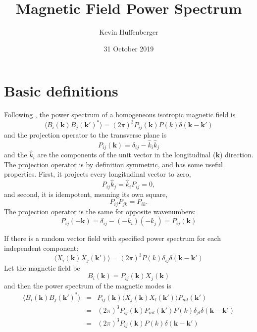 \documentclass{article}
\begin{document}
\title{Magnetic Field Power Spectrum}
\author{Kevin Huffenberger}
\date{31 October 2019}
\maketitle
 
\section{Basic definitions}

Following \citet{2002PhRvD..65l3004M}, the power spectrum of a homogeneous isotropic magnetic field is
\begin{equation}
  \langle B_i(\mathbf{k})  B_j(\mathbf{k}')^* \rangle = (2\pi)^3 P_{ij}(\mathbf{k}) P(k) \delta(\mathbf{k - k}')
  \label{eqn:psdef}
 \end{equation}
 and the projection operator to the transverse plane is
 \begin{equation}
    P_{ij}(\mathbf{k})  = \delta_{ij} - \hat k_i \hat k_j
 \end{equation}
 and the $\hat k_i$ are the components of the unit vector in the longitudinal ($\mathbf{k}$) direction.  The projection operator is by definition symmetric, and has some useful properties.  First, it projects every longitudinal vector to zero,
 \begin{equation}
   P_{ij} \hat k_j =  \hat k_i P_{ij} = 0,
   \label{eqn:transproj}
 \end{equation}
 and second, it is idempotent, meaning its own square,
 \begin{equation}
   P_{ij}P_{jk} = P_{ik}.
   \label{eqn:idemproj}
 \end{equation}
  The projection operator is the same for opposite wavenumbers:
 \begin{equation}
   P_{ij}(-\mathbf{k}) = \delta_{ij} - (-k_i)(-k_j) = P_{ij}(\mathbf{k})
 \end{equation}

 
 If there is a random vector field with specified power spectrum for each independent component:
 \begin{equation}
   \langle X_i(\mathbf{k}) X_j(\mathbf{k}') \rangle = (2\pi)^3 P(k) \delta_{ij}\delta(\mathbf{k - k'})
 \end{equation}
 Let the magnetic field be 
 \begin{equation}
   B_i(\mathbf{k}) = P_{ij}(\mathbf{k}) X_j(\mathbf{k})
 \end{equation}
 and then the power spectrum of the magnetic modes is
 \begin{eqnarray}
   \langle B_i(\mathbf{k})  B_j(\mathbf{k}')^* \rangle &=&  P_{ij}(\mathbf{k}) \langle X_j(\mathbf{k}) X_l(\mathbf{k'}) \rangle P_{ml}(\mathbf{k'}) \\ \nonumber
   &=& (2\pi)^3 P_{ij}(\mathbf{k}) P_{ml}(\mathbf{k'}) P(k) \delta_{jl} \delta(\mathbf{k - k'})\\ \nonumber
   &=& (2\pi)^3 P_{ij}(\mathbf{k}) P(k) \delta(\mathbf{k - k}')
 \end{eqnarray}
\end{document}
